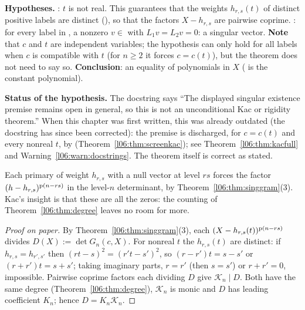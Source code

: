 \begin{dictionary}
\textbf{Hypotheses.} : $t$ is not real. This guarantees that the weights $h_{r,s}(t)$ of
distinct positive labels are distinct (\allowbreak{}\allowbreak{}), so that the factors
$X-h_{r,s}$ are pairwise coprime. : for every label in , a nonzero
$v\in$ with $L_1v = L_2v = 0$: a singular vector. \textbf{Note} that $c$
and $t$ are independent variables; the hypothesis  can only hold for all labels when $c$ is
compatible with $t$ (for $n\ge2$ it forces $c = c(t)$), but the theorem does not need to say so.
\textbf{Conclusion}: an equality of polynomials in $X$ ( is the constant polynomial).

\textbf{Status of the hypothesis.} The docstring says ``The displayed singular existence premise remains
open in general, so this is not an unconditional Kac or rigidity theorem.'' When this chapter was first written, this was already outdated (the docstring has since been corrected): the premise is discharged, for $c = c(t)$ and every nonreal $t$, by
\allowbreak{}\allowbreak{}\allowbreak{} (Theorem~\ref{l06:thm:screenkac}); see
Theorem~\ref{l06:thm:kacfull} and Warning~\ref{l06:warn:docstrings}. The theorem itself is correct as stated.
\end{dictionary}

\begin{physics}
Each primary of weight $h_{r,s}$ with a null vector at level $rs$ forces the factor
$(h-h_{r,s})^{\mathrm{p}(n-rs)}$ in the level-$n$ determinant, by Theorem~\ref{l06:thm:singgram}(3). Kac's
insight is that these are all the zeros: the counting of Theorem~\ref{l06:thm:degree} leaves no room for more.
\end{physics}

\begin{proof}[Proof on paper]
By Theorem~\ref{l06:thm:singgram}(3), each $(X-h_{r,s}(t))^{\mathrm{p}(n-rs)}$ divides $D(X) := \det G_n(c,X)$. For
nonreal $t$ the $h_{r,s}(t)$ are distinct: if $h_{r,s} = h_{r',s'}$ then $(rt-s)^2 = (r't-s')^2$, so
$(r-r')t = s-s'$ or $(r+r')t = s+s'$; taking imaginary parts, $r = r'$ (then $s = s'$) or $r+r' = 0$,
impossible. Pairwise coprime factors each dividing $D$ give $\mathcal K_n\mid D$. Both have the same degree
(Theorem~\ref{l06:thm:degree}), $\mathcal K_n$ is monic and $D$ has leading coefficient $K_n$; hence
$D = K_n\mathcal K_n$.
\end{proof}

